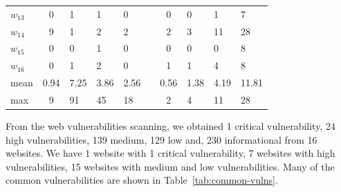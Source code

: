 \documentclass[conference,letterpaper]{IEEEtran}
\begin{document}
\begin{table}[thbp]
\begin{tabular}{lcllllclll}
          $w_{13}$ & 0 & 1 & 1 & 0 &  & 0 & 0 & 1 & 7 \\
          $w_{14}$ & 9 & 1 & 2 & 2 &  & 2 & 3 & 11 & 28 \\
          $w_{15}$ & 0 & 0 & 1 & 0 &  & 0 & 0 & 0 & 8 \\
          $w_{16}$ & 0 & 1 & 2 & 0 &  & 1 & 1 & 4 & 8 \\ \cline{2-5} \cline{7-10} 
          mean &0.94 & 7.25 & 3.86 & 2.56 & & 0.56 & 1.38 & 4.19 & 11.81 \\
          max & 9 & 91 & 45 & 18 & & 2 & 4 & 11 & 28 \\ \hline
	\end{tabular}
\end{table}

From the web vulnerabilities scanning, we obtained 1 critical
vulnerability, 24 high vulnerabilities, 139 medium, 129 low and, 230
informational from 16 websites. We have 1 website with 1 critical 
vulnerability, 7
websites with high vulnerabilities, 15 websites with medium and low
vulnerabilities. Many of the common vulnerabilities are shown in
Table~\ref{tab:common-vulns}.
\end{document}
